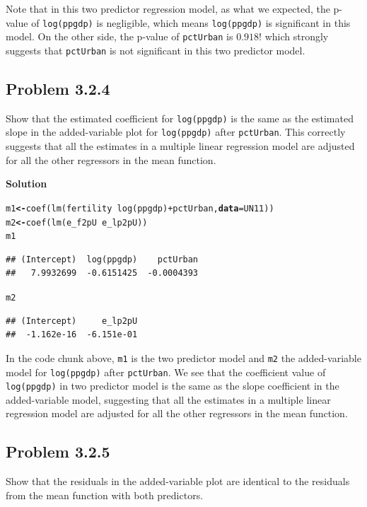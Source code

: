 \documentclass[12pt,oneside,a4paper]{article}\usepackage[]{graphicx}\usepackage[]{xcolor}
\makeatletter
\newcommand{\hlopt}[1]{\textcolor[rgb]{0,0,0}{#1}}%
\newcommand{\hlstd}[1]{\textcolor[rgb]{0,0,0}{#1}}%
\newcommand{\hlkwb}[1]{\textcolor[rgb]{0.498,0,0.333}{\textbf{#1}}}%
\newcommand{\hlkwc}[1]{\textcolor[rgb]{0.498,0,0.333}{\textbf{#1}}}%
\newcommand{\hlkwd}[1]{\textcolor[rgb]{0,0,0}{#1}}%
\newenvironment{kframe}{%
 \def\at@end@of@kframe{}%
 \ifinner\ifhmode%
  \def\at@end@of@kframe{\end{minipage}}%
  \begin{minipage}{\columnwidth}%
 \fi\fi%
 \def\FrameCommand##1{\hskip\@totalleftmargin \hskip-\fboxsep
 \colorbox{shadecolor}{##1}\hskip-\fboxsep
     \hskip-\linewidth \hskip-\@totalleftmargin \hskip\columnwidth}%
 \MakeFramed {\advance\hsize-\width
   \@totalleftmargin\z@ \linewidth\hsize
   \@setminipage}}%
 {\par\unskip\endMakeFramed%
 \at@end@of@kframe}
\newenvironment{knitrout}{}{} %
\newcommand{\subproblem}[1]
{
    \subsection*{Problem {#1}}
}
\newcommand{\solution}
{
    \vspace{15pt}
    \noindent\ignorespaces\textbf{\large Solution}
}
\newcommand{\m}[1]{\texttt{{#1}}}
\makeatother
\begin{document}
Note that in this two predictor regression model, as what we expected, the p-value of \m{log(ppgdp)} is negligible, which means \m{log(ppgdp)} is significant in this model. On the other side, the p-value of \m{pctUrban} is $0.918$! which strongly suggests that \m{pctUrban} is not significant in this two predictor model.

\subproblem{3.2.4}
Show that the estimated coefficient for \m{log(ppgdp)} is the same as the estimated slope in the added-variable plot for \m{log(ppgdp)} after \m{pctUrban}. This correctly suggests that all the estimates in a multiple linear regression model are adjusted for all the other regressors in the mean function.

\solution
\begin{knitrout}
\color{fgcolor}\begin{kframe}
\begin{alltt}
\hlstd{m1} \hlkwb{<-} \hlkwd{coef}\hlstd{(}\hlkwd{lm}\hlstd{(fertility} \hlopt{~} \hlkwd{log}\hlstd{(ppgdp)} \hlopt{+} \hlstd{pctUrban,} \hlkwc{data} \hlstd{= UN11))}
\hlstd{m2} \hlkwb{<-} \hlkwd{coef}\hlstd{(}\hlkwd{lm}\hlstd{(e_f2pU} \hlopt{~} \hlstd{e_lp2pU))}
\hlstd{m1}
\end{alltt}
\begin{verbatim}
## (Intercept)  log(ppgdp)    pctUrban 
##   7.9932699  -0.6151425  -0.0004393
\end{verbatim}
\begin{alltt}
\hlstd{m2}
\end{alltt}
\begin{verbatim}
## (Intercept)     e_lp2pU 
##  -1.162e-16  -6.151e-01
\end{verbatim}
\end{kframe}
\end{knitrout}

In the code chunk above, \m{m1} is the two predictor model and \m{m2} the added-variable model for \m{log(ppgdp)} after \m{pctUrban}. We see that the coefficient value of \m{log(ppgdp)} in two predictor model is the same as the slope coefficient in the added-variable model, suggesting that all the estimates in a multiple linear regression model are adjusted for all the other regressors in the mean function.

\subproblem{3.2.5}
Show that the residuals in the added-variable plot are identical to the residuals from the mean function with both predictors.
\end{document}

